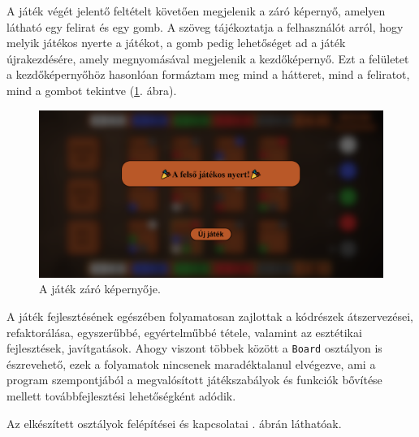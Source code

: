 
A játék végét jelentő feltételt követően megjelenik a záró képernyő, amelyen látható egy felirat és egy gomb. A szöveg tájékoztatja a felhasználót arról, hogy melyik játékos nyerte a játékot, a gomb pedig lehetőséget ad a játék újrakezdésére, amely megnyomásával megjelenik a kezdőképernyő. Ezt a felületet a kezdőképernyőhöz hasonlóan formáztam meg mind a hátteret, mind a feliratot, mind a gombot tekintve (\ref{fig:end_screen}. ábra).

\begin{figure}[h]
\centering
\includegraphics[width=\textwidth]{images/end_screen.png}
\caption{A játék záró képernyője.}
\label{fig:end_screen}
\end{figure}


A játék fejlesztésének egészében folyamatosan zajlottak a kódrészek átszervezései, refaktorálása, egyszerűbbé, egyértelműbbé tétele, valamint az esztétikai fejlesztések, javítgatások. Ahogy viszont többek között a \texttt{Board} osztályon is észrevehető, ezek a folyamatok nincsenek maradéktalanul elvégezve, ami a program szempontjából a megvalósított játékszabályok és funkciók bővítése mellett továbbfejlesztési lehetőségként adódik.


Az elkészített osztályok felépítései és kapcsolatai . ábrán láthatóak.

